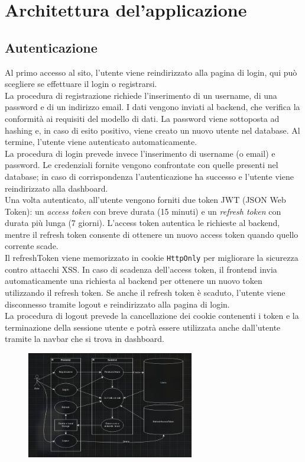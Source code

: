 \documentclass[11pt]{article}
\begin{document}
\section{Architettura del'applicazione}
\subsection{Autenticazione}
Al primo accesso al sito, l’utente viene reindirizzato alla pagina di login, qui può scegliere se effettuare il login o registrarsi. \\
La procedura di registrazione richiede l’inserimento di un username, di una password e di un indirizzo email. I dati vengono inviati al backend, che verifica la conformità ai requisiti del modello di dati. La password viene sottoposta ad hashing e, in caso di esito positivo, viene creato un nuovo utente nel database. Al termine, l’utente viene autenticato automaticamente. \\
La procedura di login prevede invece l’inserimento di username (o email) e password. Le credenziali fornite vengono confrontate con quelle presenti nel database; in caso di corrispondenza l’autenticazione ha successo e l’utente viene reindirizzato alla dashboard.\\
Una volta autenticato, all’utente vengono forniti due token JWT (JSON Web Token): un \textit{access token} con breve durata (15 minuti) e un \textit{refresh token} con durata più lunga (7 giorni). L’access token autentica le richieste al backend, mentre il refresh token consente di ottenere un nuovo access token quando quello corrente scade. \\
Il refreshToken viene memorizzato in cookie \texttt{HttpOnly} per migliorare la sicurezza contro attacchi XSS. In caso di scadenza dell’access token, il frontend invia automaticamente una richiesta al backend per ottenere un nuovo token utilizzando il refresh token. Se anche il refresh token è scaduto, l’utente viene disconnesso tramite logout e reindirizzato alla pagina di login. \\
La procedura di logout prevede la cancellazione dei cookie contenenti i token e la terminazione della sessione utente e potrà essere utilizzata anche dall'utente tramite la navbar che si trova in dashboard.
\begin{figure}[H]
    \centering
    \includegraphics[width=0.65\textwidth]{./Resources/Diagrams/UML-Autenticazione.png}
\end{figure}
\end{document}

